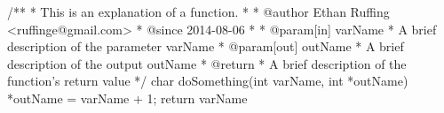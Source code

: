 \documentclass[StyleGuide.tex]{subfiles}
\begin{document}
\begin{code}[caption=Example of Doxygen comments.,label=lst:doxygen-example]
/**
 * This is an explanation of a function.
 *
 * @author Ethan Ruffing <ruffinge@gmail.com>
 * @since 2014-08-06
 *
 * @param[in] varName
 *     A brief description of the parameter varName
 * @param[out] outName
 *     A brief description of the output outName
 * @return
 *     A brief description of the function's return value
 */
char doSomething(int varName, int *outName) {
    *outName = varName + 1;
    return varName %
}
\end{code}
\end{document}
